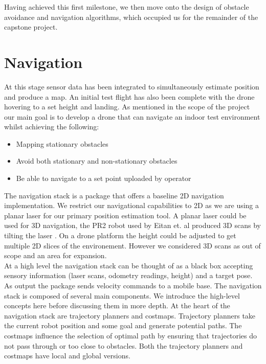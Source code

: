 \documentclass[capstone_report.tex]{subfiles}
\begin{document}
Having achieved this first milestone, we then move onto the design of obstacle avoidance and navigation algorithms, which occupied us for the remainder of the capstone project.

\section{Navigation}

At this stage sensor data has been integrated to simultaneously estimate position and produce a map.  An initial test flight has also been complete with the drone hovering to a set height and landing.  As mentioned in the scope of the project our main goal is to develop a drone that can navigate an indoor test environment whilst achieving the following:

\begin{itemize}
    \item Mapping stationary obstacles
    \item Avoid both stationary and non-stationary obstacles
    \item Be able to navigate to a set point uploaded by operator
\end{itemize}


The navigation stack is a package that offers a baseline 2D navigation implementation.  We restrict our navigational capabilities to 2D as we are using a planar laser for our primary position estimation tool.  A planar laser could be used for 3D navigation, the PR2 robot used by Eitan et. al produced 3D scans by tilting the laser \cite{marder2010office}.  On a drone platform the height could be adjusted to get multiple 2D slices of the environement.  However we considered 3D scans as out of scope and an area for expansion. \\

At a high level the navigation stack can be thought of as a black box accepting sensory information (laser scans, odometry readings, height) and a target pose.  As output the package sends velocity commands to a mobile base.  The navigation stack is composed of several main components.  We introduce the high-level concepts here before discussing them in more depth.  At the heart of the navigation stack are trajectory planners and costmaps.  Trajectory planners take the current robot position and some goal and generate potential paths.  The costmaps influence the selection of optimal path by ensuring that trajectories do not pass through or too close to obstacles.  Both the trajectory planners and costmaps have local and global versions.\\
\end{document}
